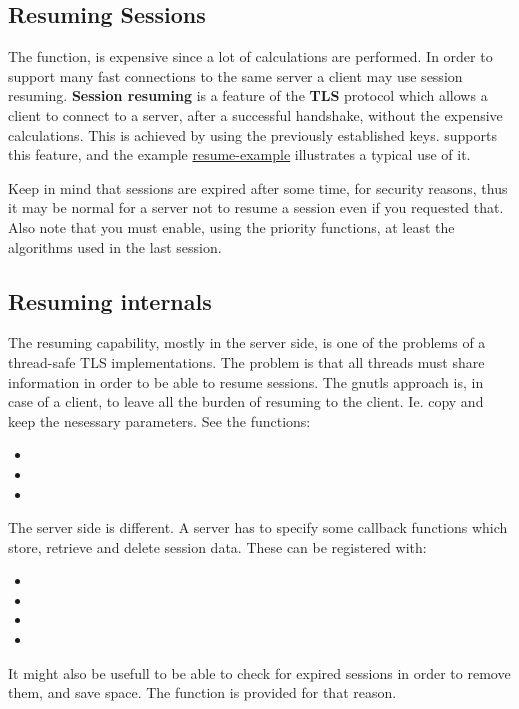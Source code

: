 \subsection{Resuming Sessions}
\label{resume}
\par
The 
 function, is expensive since a lot of calculations are performed. In order to support many fast connections to
the same server a client may use session resuming. {\bf Session resuming} is a
feature of the {\bf TLS} protocol which allows a client to connect to a server,
after a successful handshake, without the expensive calculations. This is
achieved by using the previously
established keys. \gnutls{} supports this feature, and the
example \hyperref{resume client}{resume client (see section }{)}{resume-example} illustrates a typical use of it.
\par
Keep in mind that sessions are expired after some time, for security reasons, thus
it may be normal for a server not to resume a session even if you requested that.
Also note that you must enable, using the priority functions, at least the
algorithms used in the last session.

\subsection{Resuming internals}
The resuming capability, mostly in the server side, is one of the problems of a thread-safe TLS
implementations. The problem is that all threads must share information in
order to be able to resume sessions. The gnutls approach is, in case of a
client, to leave all the burden of resuming to the client. Ie. copy and keep the
nesessary parameters. See the functions:
\begin{itemize}
\item {}
\item {}
\item {}
\end{itemize}

\par
The server side is different. A server has to specify some callback functions
which store, retrieve and delete session data. These can be registered with:
\begin{itemize}
\item {}
\item {}
\item {}
\item {}
\end{itemize}

\par
It might also be usefull to be able to check for expired sessions in order to remove 
them, and save space. The function
 is provided for that
reason.

